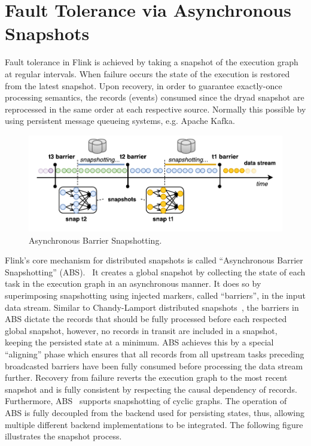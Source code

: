 

\section{Fault Tolerance via Asynchronous Snapshots}
\label{sec:snapshots}
Fault tolerance in Flink is achieved by taking a snapshot of the execution graph at regular intervals. When failure occurs the state of the execution is restored from the latest snapshot. Upon recovery, in order to guarantee exactly-once processing semantics, the records (events) consumed since the dryad snapshot are reprocessed in the same order at each respective source. Normally this possible by using persistent message queueing systems, e.g. Apache Kafka.

\begin{figure}[ht]
	\centering  	
  	\includegraphics[width=.75\textwidth]{figs/snaps.pdf}
  	\vspace{-4mm}
	\caption{Asynchronous Barrier Snapshotting.}
	\vspace{-2mm}
	\label{fig:FlinkStack}
\end{figure}

Flink's core mechanism for distributed snapshots is called ``Asynchronous Barrier Snapshotting'' (ABS).~\cite{carbone2015lightweight} It creates a global snapshot by collecting the state of each task in the execution graph in an asynchronous manner. It does so by superimposing snapshotting using injected markers, called ``barriers'', in the input data stream. Similar to Chandy-Lamport distributed snapshots~\cite{chandy1985distributed}, the barriers in ABS dictate the records that should be fully processed before each respected global snapshot, however, no records in transit are included in a snapshot, keeping the persisted state at a minimum. ABS achieves this by a special ``aligning'' phase which ensures that all records from all upstream tasks preceding broadcasted barriers have been fully consumed before processing the data stream further. Recovery from failure reverts the execution graph to the most recent snapshot and is fully consistent by respecting the causal dependency of records. Furthermore, ABS~\cite{carbone2015lightweight} supports snapshotting of cyclic graphs.  The operation of ABS is fully decoupled from the backend used for persisting states, thus, allowing multiple different backend implementations to be integrated. The following figure illustrates the snapshot process.
